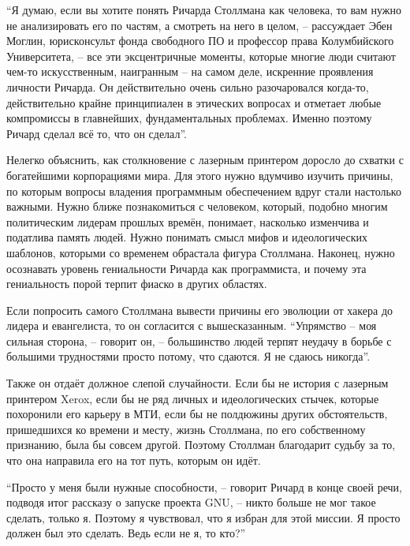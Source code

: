 ``Я думаю, если вы хотите понять Ричарда Столлмана как человека, то вам нужно не анализировать его по частям, а смотреть на него в целом, -- рассуждает Эбен Моглин, юрисконсульт фонда свободного ПО и профессор права Колумбийского Университета, -- все эти эксцентричные моменты, которые многие люди считают чем-то искусственным, наигранным -- на самом деле, искренние проявления личности Ричарда. Он действительно очень сильно разочаровался когда-то, действительно крайне принципиален в этических вопросах и отметает любые компромиссы в главнейших, фундаментальных проблемах. Именно поэтому Ричард сделал всё то, что он сделал''.

Нелегко объяснить, как столкновение с лазерным принтером доросло до схватки с богатейшими корпорациями мира. Для этого нужно вдумчиво изучить причины, по которым вопросы владения программным обеспечением вдруг стали настолько важными. Нужно ближе познакомиться с человеком, который, подобно многим политическим лидерам прошлых времён, понимает, насколько изменчива и податлива память людей. Нужно понимать смысл мифов и идеологических шаблонов, которыми со временем обрастала фигура Столлмана. Наконец, нужно осознавать уровень гениальности Ричарда как программиста, и почему эта гениальность порой терпит фиаско в других областях.

Если попросить самого Столлмана вывести причины его эволюции от хакера до лидера и евангелиста, то он согласится с вышесказанным. ``Упрямство -- моя сильная сторона, -- говорит он, -- большинство людей терпят неудачу в борьбе с большими трудностями просто потому, что сдаются. Я не сдаюсь никогда''.

Также он отдаёт должное слепой случайности. Если бы не история с лазерным принтером Xerox, если бы не ряд личных и идеологических стычек, которые похоронили его карьеру в МТИ, если бы не полдюжины других обстоятельств, пришедшихся ко времени и месту, жизнь Столлмана, по его собственному признанию, была бы совсем другой. Поэтому Столлман благодарит судьбу за то, что она направила его на тот путь, которым он идёт.

``Просто у меня были нужные способности, -- говорит Ричард в конце своей речи, подводя итог рассказу о запуске проекта GNU, -- никто больше не мог такое сделать, только я. Поэтому я чувствовал, что я избран для этой миссии. Я просто должен был это сделать. Ведь если не я, то кто?\hspace{0.01in}''

\theendnotes
\setcounter{endnote}{0}
